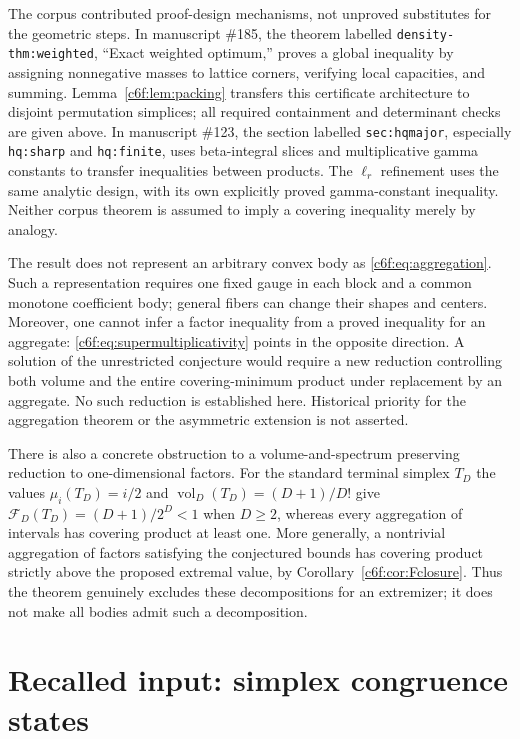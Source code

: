 \documentclass[11pt,a4paper]{article}
\theoremstyle{remark}\newtheorem{remark}[theorem]{Remark}
\begin{document}
The corpus contributed proof-design mechanisms, not unproved
substitutes for the geometric steps.  In manuscript \#185,
the theorem labelled \texttt{density-thm:weighted}, ``Exact
weighted optimum,'' proves a global inequality by assigning
nonnegative masses to lattice corners, verifying local capacities,
and summing.  Lemma~\ref{c6f:lem:packing} transfers this
certificate architecture to disjoint permutation simplices;
all required containment and determinant checks are given above.
In manuscript \#123, the section labelled \texttt{sec:hqmajor},
especially \texttt{hq:sharp} and \texttt{hq:finite}, uses
beta-integral slices and multiplicative gamma constants to
transfer inequalities between products.  The $\ell_r$ refinement
uses the same analytic design, with its own explicitly proved
gamma-constant inequality.  Neither corpus theorem is assumed
to imply a covering inequality merely by analogy.

The result does not represent an arbitrary convex body as
\eqref{c6f:eq:aggregation}.  Such a representation requires one
fixed gauge in each block and a common monotone coefficient body;
general fibers can change their shapes and centers.  Moreover,
one cannot infer a factor inequality from a proved inequality for
an aggregate: \eqref{c6f:eq:supermultiplicativity} points in the
opposite direction.  A solution of the unrestricted conjecture
would require a new reduction controlling both volume and the
entire covering-minimum product under replacement by an aggregate.
No such reduction is established here.  Historical priority for
the aggregation theorem or the asymmetric extension is not
asserted.

There is also a concrete obstruction to a volume-and-spectrum
preserving reduction to one-dimensional factors.  For the standard
terminal simplex $T_D$ the values $\mu_i(T_D)=i/2$ and
$\operatorname{vol}_D(T_D)=(D+1)/D!$ give
$\mathcal F_D(T_D)=(D+1)/2^D<1$ when $D\ge2$, whereas every
aggregation of intervals has covering product at least one.
More generally, a nontrivial aggregation of factors satisfying the
conjectured bounds has covering product strictly above the proposed
extremal value, by Corollary~\ref{c6f:cor:Fclosure}.  Thus the
theorem genuinely excludes these decompositions for an extremizer;
it does not make all bodies admit such a decomposition.


\section{Recalled input: simplex congruence states}
\label{eq:section}
\end{document}
